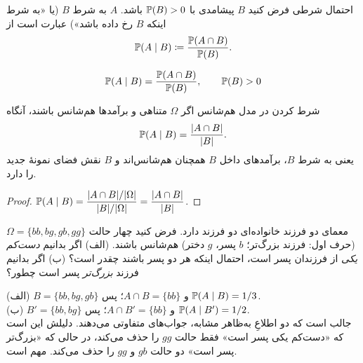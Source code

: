 \begin{definition}[label=def:cond]{احتمال شرطی}
فرض کنید $B$ پیشامدی با $\P(B)>0$ باشد.  $A$ به شرط $B$ (یا «به شرط اینکه $B$ رخ داده باشد») عبارت است از
\[ \P(A\mid B)\defeq\frac{\P(A\cap B)}{\P(B)}. \]
\end{definition}

\begin{keyformula}
\[ \P(A\mid B)=\frac{\P(A\cap B)}{\P(B)},\qquad \P(B)>0 \]
\end{keyformula}

\begin{proposition}[label=prop:cond-uniform]{شرط کردن در مدل هم‌شانس}
اگر $\Omega$ متناهی و برآمدها هم‌شانس باشند، آنگاه
\[ \P(A\mid B)=\frac{|A\cap B|}{|B|}. \]
یعنی به شرط $B$، برآمدهای داخل $B$ همچنان هم‌شانس‌اند و $B$ نقش فضای نمونهٔ جدید را دارد.
\end{proposition}

\begin{proof}
$\P(A\mid B)=\dfrac{|A\cap B|/|\Omega|}{|B|/|\Omega|}=\dfrac{|A\cap B|}{|B|}$.
\end{proof}

\begin{example}[label=ex:two-children]{معمای دو فرزند}
خانواده‌ای دو فرزند دارد. فرض کنید چهار حالت $\Omega=\{bb,bg,gb,gg\}$ (حرف اول: فرزند بزرگ‌تر؛ $b$ پسر، $g$ دختر) هم‌شانس باشند.
(الف) اگر بدانیم \emph{دست‌کم یکی} از فرزندان پسر است، احتمال اینکه هر دو پسر باشند چقدر است؟
(ب) اگر بدانیم فرزند \emph{بزرگ‌تر} پسر است چطور؟
\begin{solution}
(الف) $B=\{bb,bg,gb\}$ و $A\cap B=\{bb\}$؛ پس $\P(A\mid B)=1/3$.\\
(ب) $B'=\{bb,bg\}$ و $A\cap B'=\{bb\}$؛ پس $\P(A\mid B')=1/2$.\\
جالب است که دو اطلاعِ به‌ظاهر مشابه، جواب‌های متفاوتی می‌دهند. دلیلش این است که «دست‌کم یکی پسر است» فقط حالت $gg$ را حذف می‌کند، در حالی که «بزرگ‌تر پسر است» دو حالت $gb$ و $gg$ را حذف می‌کند.  مهم است.
\end{solution}
\end{example}

